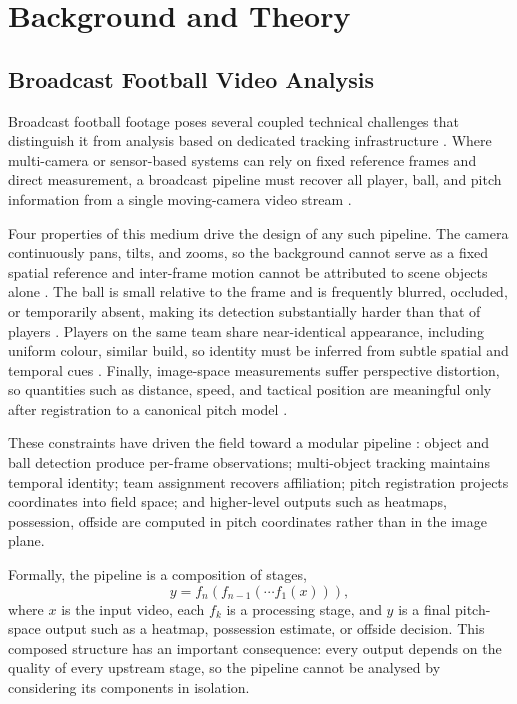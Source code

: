 \chapter{Background and Theory}
\label{ch:background}

\section{Broadcast Football Video Analysis}
\label{sec:background_broadcast_football}

Broadcast football footage poses several coupled technical 
challenges that distinguish it from analysis based on dedicated 
tracking infrastructure \cite{Theiner2022, Liu2009}. Where 
multi-camera or sensor-based systems can rely on fixed reference 
frames and direct measurement, a broadcast pipeline must recover 
all player, ball, and pitch information from a single 
moving-camera video stream \cite{Goes2021}.

Four properties of this medium drive the design of any such 
pipeline. The camera continuously pans, tilts, and zooms, so the 
background cannot serve as a fixed spatial reference and 
inter-frame motion cannot be attributed to scene objects alone 
\cite{Theiner2022}. The ball is small relative to the frame and is frequently 
blurred, occluded, or temporarily absent, making its detection 
substantially harder than that of players \cite{Cioppa2022, Komorowski2020FootAndBall}. Players 
on the same team share near-identical appearance, including uniform 
colour, similar build, so identity must be inferred from subtle 
spatial and temporal cues \cite{Theiner2022}. Finally, 
image-space measurements suffer perspective distortion, so 
quantities such as distance, speed, and tactical position are 
meaningful only after registration to a canonical pitch model 
\cite{TVCalib2023}.

These constraints have driven the field toward a modular pipeline 
\cite{Theiner2022, Liu2009}: object and ball detection produce 
per-frame observations; multi-object tracking maintains temporal 
identity; team assignment recovers affiliation; pitch registration 
projects coordinates into field space; and higher-level outputs such as 
heatmaps, possession, offside are computed in pitch coordinates 
rather than in the image plane.

Formally, the pipeline is a composition of stages,
\begin{equation}
    y = f_n\!\left(f_{n-1}\!\left(\cdots f_1(x)\right)\right),
    \label{eq:pipeline_composition}
\end{equation}
where \(x\) is the input video, each \(f_k\) is a 
processing stage, and \(y\) is a final pitch-space output 
such as a heatmap, possession estimate, or offside 
decision. This composed structure has an important 
consequence: every output depends on the quality of every 
upstream stage, so the pipeline cannot be analysed by 
considering its components in isolation.


